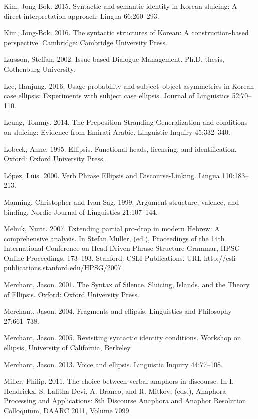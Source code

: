 \documentclass[output=paper
                ,modfonts
                ,nonflat
	        ,collection
	        ,collectionchapter
	        ,collectiontoclongg
 	        ,biblatex
                ,babelshorthands
                ,newtxmath
                ,draftmode
                ,colorlinks, citecolor=brown
]{./langsci/langscibook}
\begin{document}
\begin{description}
\item Kim, Jong-Bok. 2015. Syntactic and semantic identity in Korean sluicing: A direct interpretation approach. Lingua 66:260--293.
\item Kim, Jong-Bok. 2016. The syntactic structures of Korean: A construction-based perspective. Cambridge: Cambridge University Press.
\item Larsson, Steffan. 2002. Issue based Dialogue Management. Ph.D. thesis, Gothenburg
University.
\item Lee, Hanjung. 2016. Usage probability and subject--object asymmetries in Korean case ellipsis: Experiments with subject case ellipsis. Journal of Linguistics 52:70--110.
\item Leung, Tommy. 2014. The Preposition Stranding Generalization and conditions on sluicing: Evidence from Emirati Arabic. Linguistic Inquiry 45:332--340.
\item Lobeck, Anne. 1995. Ellipsis. Functional heads, licensing, and identification. Oxford: Oxford University Press.
\item L\'{o}pez, Luis. 2000. Verb Phrase Ellipsis and Discourse-Linking. Lingua 110:183--213.
\item Manning, Christopher and Ivan Sag. 1999. Argument structure, valence, and binding. Nordic Journal of Linguistics 21:107--144.
\item Melnik, Nurit. 2007. Extending partial pro-drop in modern Hebrew: A comprehensive analysis. In Stefan M\"{u}ller, (ed.), Proceedings of the 14th International Conference on Head-Driven Phrase Structure Grammar, HPSG Online Proceedings, 173--193. Stanford: CSLI Publications. URL http://csli-publications.stanford.edu/HPSG/2007.
\item Merchant, Jason. 2001. The Syntax of Silence. Sluicing, Islands, and the Theory of Ellipsis.
Oxford: Oxford University Press.
\item Merchant, Jason. 2004. Fragments and ellipsis. Linguistics and Philosophy 27:661--738.
\item Merchant, Jason. 2005. Revisiting syntactic identity conditions. Workshop on ellipsis, University of California, Berkeley.
\item Merchant, Jason. 2013. Voice and ellipsis. Linguistic Inquiry 44:77--108.
\item Miller, Philip. 2011. The choice between verbal anaphors in discourse. In I. Hendrickx,
S. Lalitha Devi, A. Branco, and R. Mitkov, (eds.), Anaphora Processing and Applications:
8th Discourse Anaphora and Anaphor Resolution Colloquium, DAARC 2011, Volume 7099

\end{description}
\end{document}

